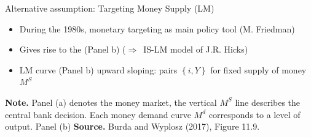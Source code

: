 \documentclass{beamer}
\newcommand{\tb}[1]{{\color{blue}{\textbf{#1}}}}
\newcommand{\rarr}{$\Rightarrow$\ }
\begin{document}
\begin{frame}{Alternative assumption: Targeting Money Supply (LM)}
  {\small
\begin{itemize}
  \item During the 1980s, monetary targeting as main policy tool (M. Friedman)
\item Gives rise to the \tb{LM curve} (Panel b) (\rarr IS-LM model  of J.R. Hicks)
\item %
  LM curve (Panel b) upward sloping: pairs $\left\{i,Y \right\}$ for fixed supply of money $M^S$%
\end{itemize}
}
\begin{center}
\begin{figure}[h!]
\end{figure}
\begin{minipage}{1.0\columnwidth}
\tiny	
\textbf{Note.} Panel (a) denotes the money market, the vertical $M^S$ line describes the central bank decision. Each money demand curve $M^d$ corresponds to a level of output. Panel (b) 
\textbf{Source.} Burda and Wyplosz (2017), Figure 11.9.\\
\end{minipage}
\end{center}
\end{frame}
\end{document}
